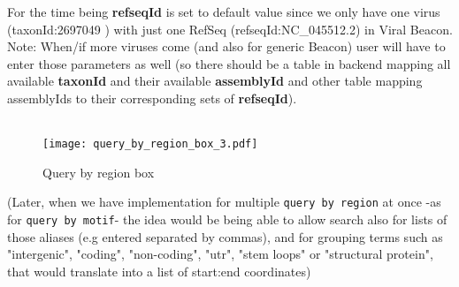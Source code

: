 \documentclass[a4paper, 10pt]{article}        %
\begin{document}
For the time being \textbf{refseqId} is set to default value since we only have one virus (taxonId:2697049 ) with just one RefSeq (refseqId:NC\_045512.2) in Viral Beacon. Note: When/if more viruses come (and also for generic Beacon) user will have to enter those parameters as well (so there should be a table in backend mapping all available \textbf{taxonId} and their available \textbf{assemblyId} and other table mapping assemblyIds to their corresponding sets of \textbf{refseqId}).\\


\\

 
     \begin{figure}[h!]
     \centering
     \texttt{[image: query\_by\_region\_box\_3.pdf]}
     \caption{Query by region box}
     \label{fig:querybox}
     \end{figure}
     
(Later, when we have implementation for multiple \texttt{query by region} at once -as for \texttt{query by motif}- the idea would be being able to allow search also for lists of those aliases (e.g entered separated by commas), and for grouping terms such as "intergenic", "coding", "non-coding", "utr", "stem loops" or "structural protein", that would translate into a list of start:end coordinates)


\end{document}
